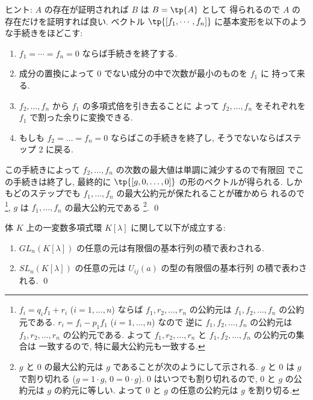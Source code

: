 \documentclass[12pt,twoside]{jarticle}
\begin{document}
\noindent
ヒント: $A$ の存在が証明されれば $B$ は $B=\tp{A}$ として
得られるので $A$ の存在だけを証明すれば良い.
ベクトル $\tp{[f_1,\cdots,f_n]}$ に基本変形を以下のような手続きをほどこす:
\begin{enumerate}
\item $f_1=\cdots=f_n=0$ ならば手続きを終了する.
\item 成分の置換によって $0$ でない成分の中で次数が最小のものを $f_1$ に
  持って来る.
\item $f_2,\dots,f_n$ から $f_1$ の多項式倍を引き去ることに
  よって $f_2,\ldots,f_n$ をそれぞれを $f_1$ で割った余りに変換できる.
\item もしも $f_2=\dots=f_n=0$ ならばこの手続きを終了し, 
  そうでないならばステップ 2 に戻る.
\end{enumerate}
この手続きによって $f_2,\dots,f_n$ の次数の最大値は単調に減少するので有限回
でこの手続きは終了し, 最終的に $\tp{[g,0,\dots,0]}$ の形のベクトルが得られる.
しかもどのステップでも $f_1,\dots,f_n$ の最大公約元が保たれることが確かめら
れるので%
\footnote{$f_i=q_if_1+r_i$ ($i=1,\dots,n$) 
  ならば $f_1,r_2,\dots,r_n$ の公約元は $f_1,f_2,\dots,f_n$ の公約元である. 
  $r_i=f_i-p_1f_1$ ($i=1,\dots,n$) なので
  逆に $f_1,f_2,\dots,f_n$ の公約元は $f_1,r_2,\dots,r_n$ の公約元である. 
  よって $f_1,r_2,\dots,r_n$ と $f_1,f_2,\dots,f_n$ の公約元の集合は
  一致するので, 特に最大公約元も一致する.}, 
$g$ は $f_1,\dots,f_n$ の最大公約元である%
\footnote{$g$ と $0$ の最大公約元は $g$ であることが次のようにして示される.
  $g$ と $0$ は $g$ で割り切れる ($g=1\cdot g$, $0=0\cdot g$). 
  $0$ はいつでも割り切れるので, $0$ と $g$ の公約元は $g$ の約元に等しい.
  よって $0$ と $g$ の任意の公約元は $g$ を割り切る.}.
\qed


\begin{question}
\label{q:elem-transf-GL_n(K[x])}
  体 $K$ 上の一変数多項式環 $K[\lambda]$ に関して以下が成立する:
  \begin{enumerate}
  \item $GL_n(K[\lambda])$ の任意の元は有限個の基本行列の積で表わされる.
  \item $SL_n(K[\lambda])$ の任意の元は $U_{ij}(a)$ の型の有限個の基本行列
    の積で表わされる.
    \qed
  \end{enumerate}
\end{question}
\end{document}
